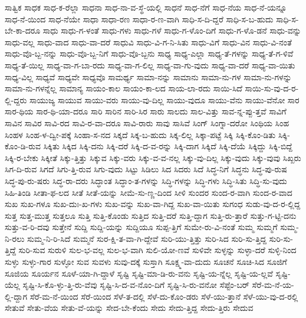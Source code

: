 {ಸಾತ್ವಿಕ
ಸಾಧಕ
ಸಾಧ-ಕ-ರೆಲ್ಲಾ
ಸಾಧನಾ
ಸಾಧ-ನಾ-ವ-ಸ್ಥೆ-ಯಲ್ಲಿ
ಸಾಧನೆ
ಸಾಧ-ನೆಗೆ
ಸಾಧ-ನೆಯ
ಸಾಧ-ನೆ-ಯನ್ನೂ
ಸಾಧ-ನೆ-ಯಿಂದ
ಸಾಧ-ನೆಯೇ
ಸಾಧಾ
ಸಾಧಾ-ರಣ
ಸಾಧಾ-ರ-ಣ-ವಾಗಿ
ಸಾಧಿ-ಸ-ದಿ-ದ್ದರೆ
ಸಾಧಿ-ಸ-ಬ-ಹುದು
ಸಾಧಿ-ಸ-ಬೇ-ಕಾ-ದರೂ
ಸಾಧು
ಸಾಧು-ಗ-ಳಂತೆ
ಸಾಧು-ಗಳು
ಸಾಧು-ಗಳೆ
ಸಾಧು-ಗ-ಳೊಂ-ದಿಗೆ
ಸಾಧು-ಗ-ಳೊ-ಡನೆ
ಸಾಧು-ವನ್ನು
ಸಾಧು-ವಲ್ಲ
ಸಾಧು-ವಾದ
ಸಾಧು-ವಾ-ದರೆ
ಸಾಧುವಿ
ಸಾಧು-ವಿ-ಗ-ನಿ-ಸಿತು
ಸಾಧು-ವಿಗೆ
ಸಾಧು-ವಿನ
ಸಾಧು-ವಿ-ನಂತೆ
ಸಾಧು-ವೊ-ಬ್ಬ-ನನ್ನು
ಸಾಧು-ವೊ-ಬ್ಬ-ನಿಗೆ
ಸಾಧು-ವೊ-ಬ್ಬನು
ಸಾಧ್ಯ
ಸಾಧ್ಯ-ಎಲ್ಲಾ
ಸಾಧ್ಯ-ತೆ-ಗಳನ್ನು
ಸಾಧ್ಯ-ತೆ-ಗ-ಳಿವೆ
ಸಾಧ್ಯ-ತೆ-ಯಿಲ್ಲ
ಸಾಧ್ಯ-ವಾ-ಗ-ಬಾ-ರದು
ಸಾಧ್ಯ-ವಾ-ಗ-ಲಿಲ್ಲ
ಸಾಧ್ಯ-ವಾ-ಗು-ವುದು
ಸಾಧ್ಯ-ವಾ-ದರೆ
ಸಾಧ್ಯ-ವಾ-ಯಿತು
ಸಾಧ್ಯ-ವಿಲ್ಲ
ಸಾಧ್ಯವೆ
ಸಾಧ್ಯವೇ
ಸಾಧ್ಯವೊ
ಸಾಮರ್ಥ್ಯ
ಸಾಮಾ-ನನ್ನು
ಸಾಮಾನು
ಸಾಮಾ-ನು-ಗಳ
ಸಾಮಾ-ನು-ಗಳನ್ನು
ಸಾಮಾ-ನು-ಗಳನ್ನೆಲ್ಲ
ಸಾಮಾನ್ಯ
ಸಾಯಂ-ಕಾಲ
ಸಾಯಂ-ಕಾ-ಲದ
ಸಾಯ-ಲಾ-ರದು
ಸಾಯಿ-ಸಿದೆ
ಸಾಯಿ-ಸು-ವು-ದ-ರ-ಲ್ಲಿ-ದ್ದರು
ಸಾಯುಜ್ಯ
ಸಾಯುವ
ಸಾಯು-ವರು
ಸಾಯು-ವು-ದಿಲ್ಲ
ಸಾಯು-ವುದೂ
ಸಾಯು-ವೆನು
ಸಾಯು-ವೆನೋ
ಸಾರ
ಸಾರ-ಥಿಯ
ಸಾರ-ಥಿ-ಯಾ-ದರೂ
ಸಾರಿ
ಸಾರಿನ
ಸಾರಿ-ಸಿರ
ಸಾರು
ಸಾಲದು
ಸಾಲ-ವಿತ್ತು
ಸಾವ-ನ್ನ-ಪ್ಪು-ತ್ತವೆ
ಸಾವಿಗೆ
ಸಾವಿನ
ಸಾವಿರ
ಸಾವಿ-ರದ
ಸಾವಿ-ರ-ವಾ-ದರೂ
ಸಾವಿ-ರಾರು
ಸಾವು
ಸಾಸಿವೆ
ಸಿಂಗ್
ಸಿಂಗ್ನಾ-ದರೋ
ಸಿಂಥಿಯ
ಸಿಂಹ
ಸಿಂಹಳ
ಸಿಂಹ-ಳ-ದ್ವೀ-ಪಕ್ಕೆ
ಸಿಂಹಾ-ಸ-ನದ
ಸಿಕ್ಕದೆ
ಸಿಕ್ಕ-ಬ-ಹುದು
ಸಿಕ್ಕ-ಲಿಲ್ಲ
ಸಿಕ್ಕಾ-ಪಟ್ಟೆ
ಸಿಕ್ಕಿ
ಸಿಕ್ಕಿ-ಕೊಂ-ಡಿತು
ಸಿಕ್ಕಿ-ಕೊಂ-ಡಿ-ರುವ
ಸಿಕ್ಕಿತು
ಸಿಕ್ಕಿದ
ಸಿಕ್ಕಿ-ದನು
ಸಿಕ್ಕಿ-ದರೆ
ಸಿಕ್ಕಿ-ದ-ವ-ರನ್ನು
ಸಿಕ್ಕಿ-ದಾಗ
ಸಿಕ್ಕಿದೆ
ಸಿಕ್ಕಿ-ದೆಯೆ
ಸಿಕ್ಕಿದ್ದು
ಸಿಕ್ಕಿ-ಬಿದ್ದೆ
ಸಿಕ್ಕಿ-ರ-ಬೇಕು
ಸಿಕ್ಕೀತೆ
ಸಿಕ್ಕು-ತ್ತಿತ್ತು
ಸಿಕ್ಕುವ
ಸಿಕ್ಕು-ವರು
ಸಿಕ್ಕು-ವ-ವ-ನಲ್ಲ
ಸಿಕ್ಕು-ವು-ದಿಲ್ಲ
ಸಿಕ್ಕು-ವುದು
ಸಿಕ್ಕು-ವುವು
ಸಿಖ್ಖರು
ಸಿಗ-ದಿ-ರುವ
ಸಿಗದೆ
ಸಿಗು-ತ್ತಿ-ರುವ
ಸಿಗು-ವುದು
ಸಿಟ್ಟು
ಸಿಡಿಲು
ಸಿದ
ಸಿದರು
ಸಿದೆ
ಸಿದ್ಧ-ನಿಗೆ
ಸಿದ್ಧನು
ಸಿದ್ಧ-ಪು-ರುಷ
ಸಿದ್ಧ-ಪು-ರು-ಷರು
ಸಿದ್ಧ-ರಾ-ದರು
ಸಿದ್ಧಾಂತ
ಸಿದ್ಧಾಂ-ತ-ಗಳನ್ನು
ಸಿದ್ಧಿ-ಗಳನ್ನು
ಸಿದ್ಧಿ-ಗಳು
ಸಿದ್ಧಿ-ಸಿತು
ಸಿದ್ಧಿ-ಸು-ವುದು
ಸಿಹಿ-ತಿಂಡಿ
ಸೀತಾ-ಫ-ಲದ
ಸೀತೆ
ಸೀತೆ-ಯನ್ನು
ಸೀಮೆ-ಸು-ಣ್ಣ-ದಿಂದ
ಸೀಳಿ
ಸುಂದರ
ಸುಂದ-ರ-ವಾಗಿ
ಸುಂದ-ರ-ವಾದ
ಸುಖ
ಸುಖ-ಗಳೂ
ಸುಖ-ದುಃ-ಖ-ಗಳು
ಸುಖ-ವನ್ನು
ಸುಖ-ವಾ-ಗಿದ್ದ
ಸುಖ-ವಾ-ಯಿತು
ಸುಗಂಧ
ಸುಡು-ವು-ದ-ರ-ಲ್ಲಿದ್ದ
ಸುತ್ತ
ಸುತ್ತ-ಮುತ್ತ
ಸುತ್ತಲೂ
ಸುತ್ತಿ
ಸುತ್ತಿ-ಕೊಂಡು
ಸುತ್ತಿದ
ಸುತ್ತಿ-ದರೆ
ಸುತ್ತಿ-ದ್ದಾಗ
ಸುತ್ತಿ-ರು-ತ್ತಾರೆ
ಸುತ್ತು-ಗ-ಟ್ಟಿ-ದನು
ಸುತ್ತು-ವ-ರಿ-ದವು
ಸುತ್ತೇನೆ
ಸುದ್ದಿ
ಸುದ್ದಿ-ಯನ್ನು
ಸುದ್ದಿಯೂ
ಸುಪ್ಪ-ತ್ತಿಗೆ
ಸುಮೇ-ರು-ವಿ-ನಂತೆ
ಸುಮ್ಮ
ಸುಮ್ಮಗೆ
ಸುಮ್ಮ-ನಿ-ರಲು
ಸುಮ್ಮ-ನಿ-ರಿ-ಸಿದೆ
ಸುಮ್ಮನೆ
ಸುರ-ಕ್ಷಿ-ತ-ವಾ-ಗಿ-ದ್ದೇವೆ
ಸುರಿ-ಯು-ತ್ತಿತ್ತು
ಸುರಿ-ಸಿದ
ಸುರಿ-ಸು-ತ್ತಿದ್ದ
ಸುರಿ-ಸು-ತ್ತಿದ್ದೆ
ಸುರಿ-ಸುವ
ಸುರುಳಿ
ಸುಲ-ಭ-ವಲ್ಲ
ಸುಲ-ಭ-ವಾಗಿ
ಸುಲಿ-ಯೋ-ಣವೆ
ಸುಳಿವೇ
ಸುಳ್ಳನ್ನು
ಸುಳ್ಳಾ-ದರೆ
ಸುಳ್ಳಿ-ನಿಂದ
ಸುಳ್ಳು
ಸುಳ್ಳು-ಗಾರ
ಸುಳ್ಳೋ
ಸುವ
ಸುವಳು
ಸುವು-ದಕ್ಕೆ
ಸುಸ್ತಾಗಿ
ಸೂಕ್ಷ್ಮ-ವಾ-ದುದು
ಸೂಚನೆ
ಸೂಚಿ-ಸಿದ
ಸೂಜಿಗೆ
ಸೂಜಿಯ
ಸೂರ್ಯನ
ಸೂಳೆ-ಯಾ-ಗಿ-ದ್ದಾಳೆ
ಸೃಷ್ಟಿ
ಸೃಷ್ಟಿ-ಮಾ-ಡಿ-ರು-ವನು
ಸೃಷ್ಟಿ-ಯ-ನ್ನೆಲ್ಲ
ಸೃಷ್ಟಿ-ಯ-ಲ್ಲವೆ
ಸೃಷ್ಟಿ-ಯೆಲ್ಲ
ಸೃಷ್ಟಿ-ಸಿ-ಕೊ-ಳ್ಳು-ತ್ತಿ-ರು-ವೆವು
ಸೃಷ್ಟಿ-ಸಿ-ದ-ವ-ನೊಂ-ದಿಗೆ
ಸೃಷ್ಟಿ-ಸಿ-ರು-ವನೋ
ಸೆಪ್ಟೆಂ-ಬರ್
ಸೆರೆ-ಮ-ನೆ-ಯ-ಲ್ಲಿ-ದ್ದಾಗ
ಸೆರೆ-ಮ-ನೆ-ಯಿಂದ
ಸೆರೆ-ಯಿಂದ
ಸೆಳೆ-ತ-ದಲ್ಲಿ
ಸೆಳೆ-ದು-ಕೊಂ-ಡರು
ಸೆಳೆ-ಯು-ತ್ತಾನೆ
ಸೆಳೆ-ಯು-ವು-ದ-ರಲ್ಲಿ
ಸೇತುವೆ
ಸೇತು-ವೆಯ
ಸೇತು-ವೆ-ಯನ್ನು
ಸೇದ-ಬೇ-ಕೆಂದು
ಸೇದು
ಸೇದು-ತ್ತಿದ್ದ
ಸೇದು-ತ್ತಿರು
ಸೇದುವ
}
